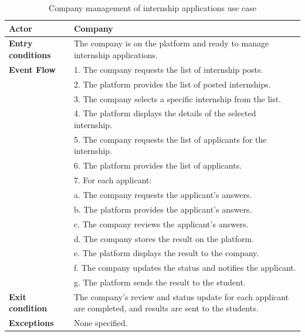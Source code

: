 \begin{table}[h!]
    \centering
    \begin{tabular}{lp{10cm}}
        \textbf{Actor} & Company \\ \hline
        \textbf{Entry conditions} & The company is on the platform and ready to manage internship applications. \\ \hline
        \textbf{Event Flow} & 
        1. The company requests the list of internship posts. \\
        & 2. The platform provides the list of posted internships. \\
        & 3. The company selects a specific internship from the list. \\
        & 4. The platform displays the details of the selected internship. \\
        & 5. The company requests the list of applicants for the internship. \\
        & 6. The platform provides the list of applicants. \\
        & 7. For each applicant: \\
        & \quad a. The company requests the applicant's answers. \\
        & \quad b. The platform provides the applicant's answers. \\
        & \quad c. The company reviews the applicant's answers. \\
        & \quad d. The company stores the result on the platform. \\
        & \quad e. The platform displays the result to the company. \\
        & \quad f. The company updates the status and notifies the applicant. \\
        & \quad g. The platform sends the result to the student. \\
        \hline
        \textbf{Exit condition} & The company's review and status update for each applicant are completed, and results are sent to the students. \\ \hline
        \textbf{Exceptions} & None specified. \\
    \end{tabular}
    \caption{Company management of internship applications use case}
    \label{tab:company_manage_internship_applications}
\end{table}

